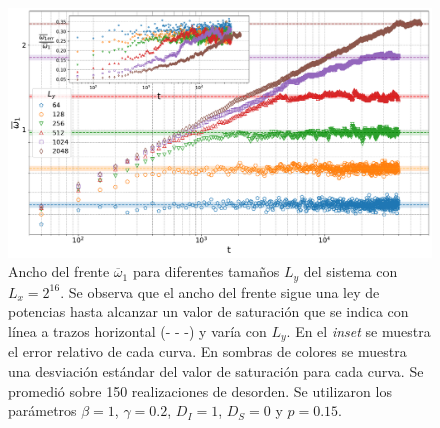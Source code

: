 \begin{figure}[!t]
    \centering
    \includegraphics[width=\imsizeL]{omega1_Ls.pdf}
    \caption[Ancho del frente de infectados $\overline{\omega}_1$ para diferentes tamaños $L_y$ del sistema con $L_x = 2^{16}$]{Ancho del frente $\overline{\omega}_1$ para diferentes tamaños $L_y$ del sistema con $L_x = 2^{16}$. Se observa que el ancho del frente sigue una ley de potencias hasta alcanzar un valor de saturación que se indica con línea a trazos horizontal (- - -) y varía con $L_y$. En el \textit{inset} se muestra el error relativo de cada curva. En sombras de colores se muestra una desviación estándar del valor de saturación para cada curva. Se promedió sobre 150 realizaciones de desorden. Se utilizaron los parámetros $\beta = 1$, $\gamma = 0.2$, $D_I = 1$, $D_S = 0$ y $p=0.15$.}
    \label{fig:omega1_Ls}
\end{figure}

